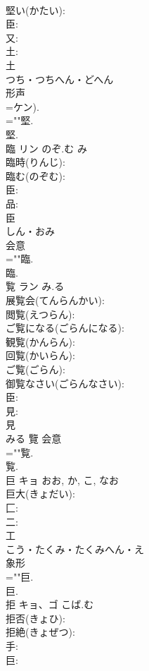 \documentclass[8pt]{extreport}
\begin{document}
\begin{CJK}{UTF8}{min}
\\	堅い(かたい): 
\\	臣: 
\\	又: 
\\	土: 
\\	土	
\\	つち・つちへん・どへん	
\\	形声 
\\	=ケン).	
\\	=""堅.
\\	堅.
\\	臨	リン	のぞ.む	み	
\\	臨時(りんじ): 
\\	臨む(のぞむ): 
\\	臣: 
\\	品: 
\\	臣	
\\	しん・おみ	
\\	会意 
\\	=""臨.
\\	臨.
\\	覧	ラン	み.る		
\\	展覧会(てんらんかい): 
\\	閲覧(えつらん): 
\\	ご覧になる(ごらんになる): 
\\	観覧(かんらん): 
\\	回覧(かいらん): 
\\	ご覧(ごらん): 
\\	御覧なさい(ごらんなさい): 
\\	臣: 
\\	見: 
\\	見	
\\	みる	覽	会意 
\\	=""覧.
\\	覧.
\\	巨	キョ		おお, か, こ, なお	
\\	巨大(きょだい): 
\\	匚: 
\\	二: 
\\	工	
\\	こう・たくみ・たくみへん・え	
\\	象形 
\\	=""巨.
\\	巨.
\\	拒	キョ、ゴ	こば.む		
\\	拒否(きょひ): 
\\	拒絶(きょぜつ): 
\\	手: 
\\	巨: 

\end{CJK}
\end{document}
